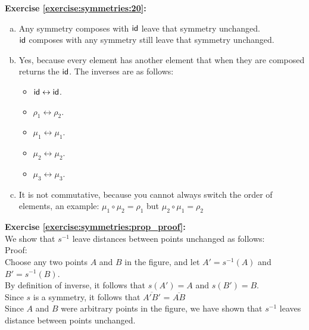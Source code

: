\noindent\textbf{Exercise \ref{exercise:symmetries:20}:}
\begin{enumerate}[(a)]
\item
Any symmetry composes with $\sf{id}$ leave that symmetry unchanged.\\
$\sf{id}$ composes with any symmetry still leave that symmetry unchanged.

\item
Yes, because every element has another element that when they are composed returns the $\sf{id}$. The inverses are as follows:\\
	\begin{multicols}{3}
	\begin{itemize}
	\item
	$\sf{id} \leftrightarrow \sf{id}$.
	
	\item
	$\rho_1 \leftrightarrow \rho_2$.
	
	\item
	$\mu_1 \leftrightarrow \mu_1$.
	
	\item
	$\mu_2 \leftrightarrow \mu_2$.
	
	\item
	$\mu_3 \leftrightarrow \mu_3$.
	\end{itemize}
	\end{multicols}
	
\item
It is not commutative, because you cannot always switch the order of elements, an example: $\mu_1\circ \mu_2 = \rho_1$ but $\mu_2\circ \mu_1=\rho_2$
\end{enumerate}

\noindent\textbf{Exercise \ref{exercise:symmetries:prop_proof}:}\\
We show that $s^{-1}$ leave distances between points unchanged as follows:\\
Proof:\\
Choose any two points $A$ and $B$ in the figure, and let $A'=s^{-1}(A)$ and $B'=s^{-1}(B)$.\\
By definition of inverse, it follows that $s(A')=A$ and $s(B')=B$.\\
Since $s$ is a symmetry, it follows that $\overline{A'B'}$ = $\overline{AB}$\\
Since $A$ and $B$ were arbitrary points in the figure, we have shown that $s^{-1}$ leaves distance between points unchanged.

